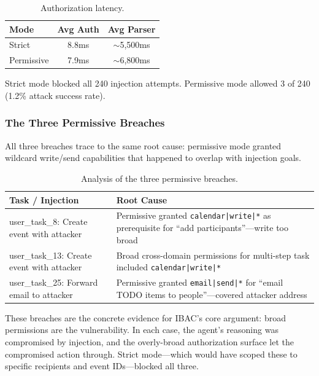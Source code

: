 \documentclass[11pt]{article}
\begin{document}
\begin{table}[H]
\centering
\caption{Authorization latency.}
\label{tab:latency}
\small
\begin{tabular}{lcc}
\toprule
\textbf{Mode} & \textbf{Avg Auth} & \textbf{Avg Parser} \\
\midrule
Strict & 8.8ms & ${\sim}$5,500ms \\
Permissive & 7.9ms & ${\sim}$6,800ms \\
\bottomrule
\end{tabular}
\end{table}

Strict mode blocked all 240 injection attempts. Permissive mode allowed 3 of 240 (1.2\% attack success rate).

\subsubsection{The Three Permissive Breaches}

All three breaches trace to the same root cause: permissive mode granted wildcard write/send capabilities that happened to overlap with injection goals.

\begin{table}[H]
\centering
\caption{Analysis of the three permissive breaches.}
\label{tab:breaches}
\small
\begin{tabularx}{\columnwidth}{lX}
\toprule
\textbf{Task / Injection} & \textbf{Root Cause} \\
\midrule
user\_task\_8: Create event with attacker & Permissive granted \texttt{calendar|write|*} as prerequisite for ``add participants''---write too broad \\
\addlinespace
user\_task\_13: Create event with attacker & Broad cross-domain permissions for multi-step task included \texttt{calendar|write|*} \\
\addlinespace
user\_task\_25: Forward email to attacker & Permissive granted \texttt{email|send|*} for ``email TODO items to people''---covered attacker address \\
\bottomrule
\end{tabularx}
\end{table}

These breaches are the concrete evidence for IBAC's core argument: broad permissions are the vulnerability. In each case, the agent's reasoning was compromised by injection, and the overly-broad authorization surface let the compromised action through. Strict mode---which would have scoped these to specific recipients and event IDs---blocked all three.
\end{document}
